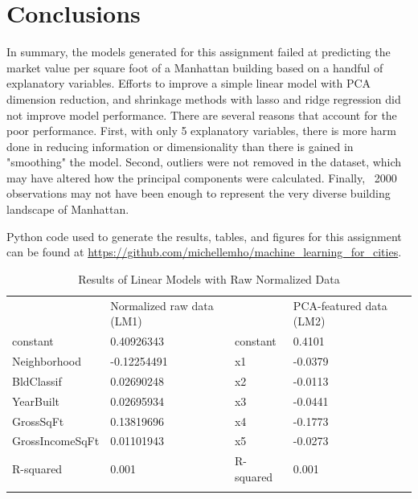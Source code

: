 \documentclass[10pt,twocolumn]{article}
\begin{document}
\section{Conclusions}

In summary, the models generated for this assignment failed at predicting
the market value per square foot of a Manhattan building based on a handful of
explanatory variables. Efforts to improve a simple linear model with PCA dimension reduction,
and shrinkage methods with lasso and ridge regression did not improve model performance.
There are several reasons that account for the poor performance. First, with only
5 explanatory variables, there is more harm done in reducing information or dimensionality than
there is gained in "smoothing" the model. Second, outliers were not removed in
the dataset, which may have altered how the principal components were calculated.
Finally, ~2000 observations may not have been enough to represent the very diverse
building landscape of Manhattan.

Python code used to generate the results, tables, and figures for this assignment can be
found at \url{https://github.com/michellemho/machine_learning_for_cities}.

\begin{center}
\begin{table}[]
\centering
\caption{Results of Linear Models with Raw Normalized Data}
\label{my-label}
\begin{tabular}{lllll}
                & Normalized raw data (LM1) &          & PCA-featured data (LM2) & \\
constant        & 0.40926343                & constant & 0.4101                  & \\
Neighborhood    & -0.12254491               & x1       & -0.0379                 & \\
BldClassif      & 0.02690248                & x2       & -0.0113                 & \\
YearBuilt       & 0.02695934                & x3       & -0.0441                 & \\
GrossSqFt       & 0.13819696                & x4       & -0.1773                 & \\
GrossIncomeSqFt & 0.01101943                & x5       & -0.0273                 & \\
R-squared       & 0.001                     & R-squared& 0.001                   & \\
                &                           &          &                         &
\end{tabular}
\end{table}
\end{center}
\end{document}
